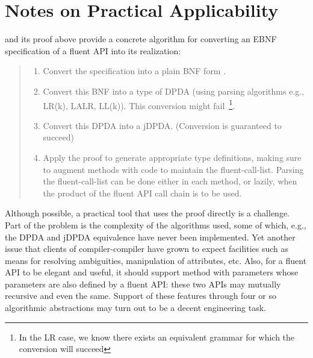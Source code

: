 \documentclass[a4paper,USenglish]{lipics-v2016}
\begin{document}
\section{Notes on Practical Applicability}
\label{section:applicability}
 and its proof above provide
  a concrete algorithm for converting an EBNF specification of a fluent API into
its realization:
\begin{quote}
  \begin{enumerate}
    \item Convert the specification into a plain BNF form
    .
    \item Convert this BNF into a type of DPDA (using parsing algorithms e.g., LR(k), LALR\@, LL(k)). 
        This conversion might 
        fail~\footnote{In the LR case, we know\cite{Knuth:65} there exists an equivalent grammar for which the conversion will succeed}.
    \item Convert this DPDA into a jDPDA. (Conversion is guaranteed to succeed)
    \item Apply the proof to generate appropriate \Java type definitions, making sure to
        augment methods with code to maintain the fluent-call-list.
        Parsing the fluent-call-list can be done either in each method,
        or lazily, when the product of the fluent API call chain is to
        be used.
  \end{enumerate}
\end{quote}
Although possible, a practical tool that uses the proof directly 
  is a challenge. 
Part of the problem is the complexity of the 
  algorithms used, some of which, e.g., the DPDA and jDPDA equivalence have never been 
  implemented.
Yet another issue that clients of compiler-compiler have grown to expect 
  facilities such as means for resolving ambiguities, manipulation 
  of attributes, etc.
Also, for a fluent API to be elegant and useful, 
  it should support method with parameters whose parameters are also defined by a  fluent API:
these two APIs may mutually recursive and even the same. 
Support of these features through four or so algorithmic abstractions 
  may turn out to be a decent engineering task.
\end{document}
